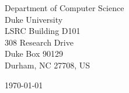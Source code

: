 \begin{minipage}{0.49\textwidth}
    \begin{flushleft}
    \noindent
    Department of Computer Science\\
    Duke University\\
    LSRC Building D101\\
    308 Research Drive\\
    Duke Box 90129\\
    Durham, NC 27708, US
    \end{flushleft}
    \end{minipage}
    \begin{minipage}{0.47\textwidth}
    \begin{flushright}
    \today
    \end{flushright}
    \end{minipage} \\
    
    \newcommand{\univ}{Duke University}
    \newcommand{\univshort}{Duke}
    \newcommand{\degree}{Ph.D.}
    \newcommand{\dept}{Computer Science}